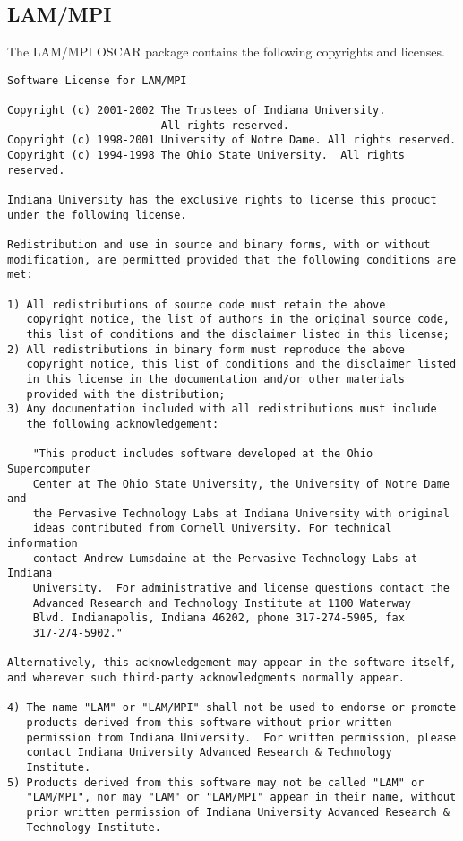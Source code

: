 %
%
%

\subsection{LAM/MPI}
The LAM/MPI OSCAR package contains the following copyrights and
licenses.

\begin{verbatim}
Software License for LAM/MPI

Copyright (c) 2001-2002 The Trustees of Indiana University.  
                        All rights reserved.
Copyright (c) 1998-2001 University of Notre Dame. All rights reserved.
Copyright (c) 1994-1998 The Ohio State University.  All rights reserved.

Indiana University has the exclusive rights to license this product
under the following license.

Redistribution and use in source and binary forms, with or without
modification, are permitted provided that the following conditions are
met:

1) All redistributions of source code must retain the above
   copyright notice, the list of authors in the original source code,
   this list of conditions and the disclaimer listed in this license; 
2) All redistributions in binary form must reproduce the above
   copyright notice, this list of conditions and the disclaimer listed
   in this license in the documentation and/or other materials
   provided with the distribution; 
3) Any documentation included with all redistributions must include
   the following acknowledgement:

    "This product includes software developed at the Ohio Supercomputer
    Center at The Ohio State University, the University of Notre Dame and
    the Pervasive Technology Labs at Indiana University with original
    ideas contributed from Cornell University. For technical information
    contact Andrew Lumsdaine at the Pervasive Technology Labs at Indiana
    University.  For administrative and license questions contact the
    Advanced Research and Technology Institute at 1100 Waterway
    Blvd. Indianapolis, Indiana 46202, phone 317-274-5905, fax
    317-274-5902."

Alternatively, this acknowledgement may appear in the software itself,
and wherever such third-party acknowledgments normally appear.

4) The name "LAM" or "LAM/MPI" shall not be used to endorse or promote
   products derived from this software without prior written
   permission from Indiana University.  For written permission, please
   contact Indiana University Advanced Research & Technology
   Institute.  
5) Products derived from this software may not be called "LAM" or
   "LAM/MPI", nor may "LAM" or "LAM/MPI" appear in their name, without
   prior written permission of Indiana University Advanced Research &
   Technology Institute. 


\end{verbatim}

